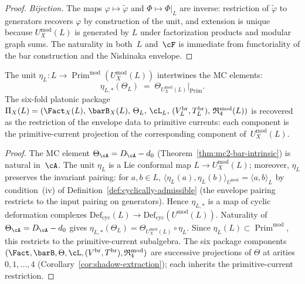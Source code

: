 \begin{proof}
\emph{Bijection.}  The maps $\varphi \mapsto \tilde\varphi$
and $\Phi \mapsto \Phi|_L$ are inverse: restriction of
$\tilde\varphi$ to generators recovers $\varphi$ by
construction of the unit, and extension is unique because
$U_X^{\mathrm{mod}}(L)$ is generated by $L$ under
factorization products and modular graph sums.  The
naturality in both~$L$ and~$\cF$ is immediate from
functoriality of the bar construction and the Nishinaka
envelope.
\end{proof}

\begin{corollary}
\label{cor:envelope-universal-mc}
\ClaimStatusProvedHere
{}
The unit $\eta_L \colon L \to
\operatorname{Prim}^{\mathrm{mod}}(U_X^{\mathrm{mod}}(L))$
intertwines the MC elements:
\[
\eta_{L,*}(\Theta_L)
\;=\;
\Theta_{U_X^{\mathrm{mod}}(L)}\big|_{\operatorname{Prim}}.
\]
The six-fold platonic package $\Pi_X(L) = (\Fact_X(L),\,
\barB_X(L),\, \Theta_L,\, \cL_L,\,
(V^{\mathrm{br}}_L, T^{\mathrm{br}}_L),\,
\mathfrak{R}_4^{\mathrm{mod}}(L))$ is recovered as the
restriction of the envelope data to primitive currents:
each component is the primitive-current projection of the
corresponding component of~$U_X^{\mathrm{mod}}(L)$.
\end{corollary}

\begin{proof}
The MC element $\Theta_\cA = D_\cA - d_0$
(Theorem~\ref{thm:mc2-bar-intrinsic}) is natural in~$\cA$.
The unit $\eta_L$ is a Lie conformal map $L \to
U_X^{\mathrm{mod}}(L)$; moreover, $\eta_L$ preserves the
invariant pairing: for $a, b \in L$,
$\langle \eta_L(a), \eta_L(b) \rangle_{U^{\mathrm{mod}}}
= \langle a, b \rangle_L$
by condition~(iv) of Definition~\ref{def:cyclically-admissible}
(the envelope pairing restricts to the input pairing on generators).
Hence $\eta_{L,*}$ is a map of cyclic deformation complexes
$\mathrm{Def}_{\mathrm{cyc}}(L) \to
\mathrm{Def}_{\mathrm{cyc}}(U^{\mathrm{mod}}(L))$.
Naturality of $\Theta_\cA = D_\cA - d_0$ gives
$\eta_{L,*}(\Theta_L) = \Theta_{U_X^{\mathrm{mod}}(L)}
\circ \eta_L$.  Since $\eta_L(L) \subset
\operatorname{Prim}^{\mathrm{mod}}$, this restricts to the
primitive-current subalgebra.  The six package components
$(\Fact, \barB, \Theta, \cL, (V^{\mathrm{br}}, T^{\mathrm{br}}),
\mathfrak{R}_4^{\mathrm{mod}})$ are successive projections of
$\Theta$ at arities $0, 1, \ldots, 4$
(Corollary~\ref{cor:shadow-extraction}); each inherits the
primitive-current restriction.
\end{proof}

